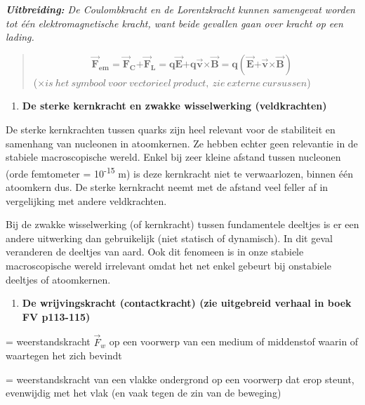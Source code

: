 \documentclass{ximera}
\begin{document}
\emph{\textbf{Uitbreiding:} De Coulombkracht en de Lorentzkracht kunnen
samengevat worden tot één elektromagnetische kracht, want beide gevallen
gaan over kracht op een lading.}

\begin{quote}
\[{{\overrightarrow{\mathbf{F}}}_{\mathbf{em}}\mathbf{=}{\overrightarrow{\mathbf{F}}}_{\mathbf{C}}\mathbf{+}{\overrightarrow{\mathbf{F}}}_{\mathbf{L}}\mathbf{= q}\overrightarrow{\mathbf{E}}\mathbf{+ q}\overrightarrow{\mathbf{v}}\mathbf{\times}\overrightarrow{\mathbf{B}}\mathbf{= q}\left( \overrightarrow{\mathbf{E}}\mathbf{+}\overrightarrow{\mathbf{v}}\mathbf{\times}\overrightarrow{\mathbf{B}} \right)\mathbf{\ \ \ \ 
}}
\](\(\times is\ het\ symbool\ voor\ vectorieel\ product,\ zie\ externe\ cursussen\))
\end{quote}

\begin{enumerate}
\def\labelenumi{\arabic{enumi}.}
\setcounter{enumi}{6}
\item
  \textbf{De sterke kernkracht en zwakke wisselwerking (veldkrachten)}
\end{enumerate}

De sterke kernkrachten tussen quarks zijn heel relevant voor de
stabiliteit en samenhang van nucleonen in atoomkernen. Ze hebben echter
geen relevantie in de stabiele macroscopische wereld. Enkel bij zeer
kleine afstand tussen nucleonen (orde femtometer =
10\textsuperscript{-15} m) is deze kernkracht niet te verwaarlozen,
binnen één atoomkern dus. De sterke kernkracht neemt met de afstand veel
feller af in vergelijking met andere veldkrachten.

Bij de zwakke wisselwerking (of kernkracht) tussen fundamentele deeltjes
is er een andere uitwerking dan gebruikelijk (niet statisch of
dynamisch). In dit geval veranderen de deeltjes van aard. Ook dit
fenomeen is in onze stabiele macroscopische wereld irrelevant omdat het
net enkel gebeurt bij onstabiele deeltjes of atoomkernen.

\begin{enumerate}
\def\labelenumi{\arabic{enumi}.}
\setcounter{enumi}{7}
\item
  \textbf{De wrijvingskracht (contactkracht) (zie uitgebreid verhaal in
  boek FV p113-115)}
\end{enumerate}

= weerstandskracht \({\overrightarrow{F}}_{w}\) op een voorwerp van een
medium of middenstof waarin of waartegen het zich bevindt

= weerstandskracht van een vlakke ondergrond op een voorwerp dat erop
steunt, evenwijdig met het vlak (en vaak tegen de zin van de beweging)
\end{document}
